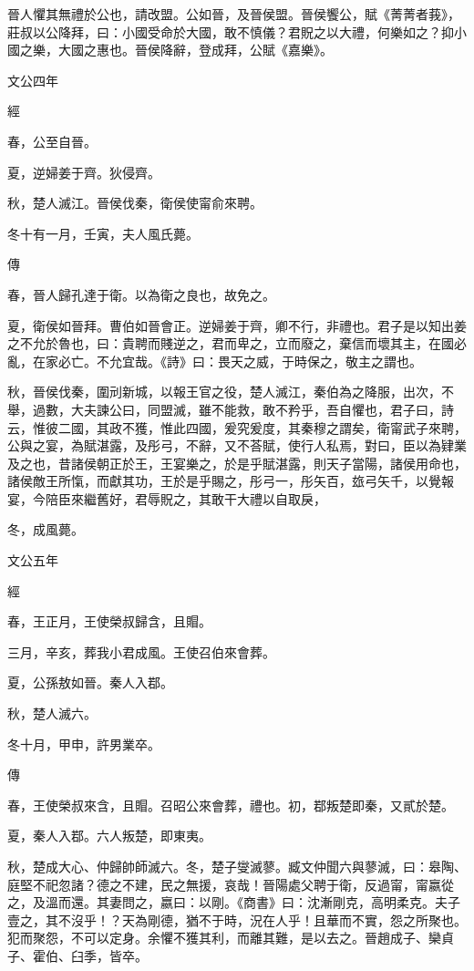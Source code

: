 \documentclass[fontset = none]{ctexart}
\begin{document}
晉人懼其無禮於公也，請改盟。公如晉，及晉侯盟。晉侯饗公，賦《菁菁者莪》，莊叔以公降拜，曰：小國受命於大國，敢不慎儀？君貺之以大禮，何樂如之？抑小國之樂，大國之惠也。晉侯降辭，登成拜，公賦《嘉樂》。





文公四年


經



春，公至自晉。

夏，逆婦姜于齊。狄侵齊。

秋，楚人滅江。晉侯伐秦，衛侯使甯俞來聘。

冬十有一月，壬寅，夫人風氏薨。

傳



春，晉人歸孔達于衛。以為衛之良也，故免之。

夏，衛侯如晉拜。曹伯如晉會正。逆婦姜于齊，卿不行，非禮也。君子是以知出姜之不允於魯也，曰：貴聘而賤逆之，君而卑之，立而廢之，棄信而壞其主，在國必亂，在家必亡。不允宜哉。《詩》曰：畏天之威，于時保之，敬主之謂也。

秋，晉侯伐秦，圍刓新城，以報王官之役，楚人滅江，秦伯為之降服，出次，不舉，過數，大夫諫公曰，同盟滅，雖不能救，敢不矜乎，吾自懼也，君子曰，詩云，惟彼二國，其政不獲，惟此四國，爰究爰度，其秦穆之謂矣，衛甯武子來聘，公與之宴，為賦湛露，及彤弓，不辭，又不荅賦，使行人私焉，對曰，臣以為肄業及之也，昔諸侯朝正於王，王宴樂之，於是乎賦湛露，則天子當陽，諸侯用命也，諸侯敵王所愾，而獻其功，王於是乎賜之，彤弓一，彤矢百，玈弓矢千，以覺報宴，今陪臣來繼舊好，君辱貺之，其敢干大禮以自取戾，

冬，成風薨。





文公五年


經



春，王正月，王使榮叔歸含，且賵。

三月，辛亥，葬我小君成風。王使召伯來會葬。

夏，公孫敖如晉。秦人入鄀。

秋，楚人滅六。

冬十月，甲申，許男業卒。

傳



春，王使榮叔來含，且賵。召昭公來會葬，禮也。初，鄀叛楚即秦，又貳於楚。

夏，秦人入鄀。六人叛楚，即東夷。

秋，楚成大心、仲歸帥師滅六。冬，楚子燮滅蓼。臧文仲聞六與蓼滅，曰：皋陶、庭堅不祀忽諸？德之不建，民之無援，哀哉！晉陽處父聘于衛，反過甯，甯嬴從之，及溫而還。其妻問之，嬴曰：以剛。《商書》曰：沈漸剛克，高明柔克。夫子壹之，其不沒乎！？天為剛德，猶不于時，況在人乎！且華而不實，怨之所聚也。犯而聚怨，不可以定身。余懼不獲其利，而離其難，是以去之。晉趙成子、欒貞子、霍伯、臼季，皆卒。
\end{document}
